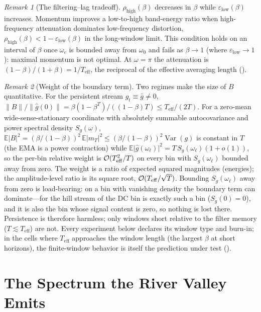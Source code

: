 \documentclass[11pt,a4paper]{article}
\theoremstyle{remark}
\newtheorem{remark}{Remark}
\newcommand{\Teff}{T_{\mathrm{eff}}}
\newcommand{\rhohigh}{\rho_{\mathrm{high}}}
\newcommand{\epslow}{\varepsilon_{\mathrm{low}}}
\begin{document}
\begin{remark}[The filtering--lag tradeoff]
\label{rem:tradeoff}
$\rhohigh(\beta)$ decreases in $\beta$ while $\epslow(\beta)$ increases.
Momentum improves a low-to-high band-energy ratio when high-frequency attenuation dominates low-frequency distortion, $\rhohigh(\beta)<1-\epslow(\beta)$ in the long-window limit.
This condition holds on an interval of $\beta$ once $\omega_c$ is bounded away from $\omega_0$ and fails as $\beta\to1$ (where $\epslow\to1$): maximal momentum is not optimal.
At $\omega=\pi$ the attenuation is $(1-\beta)/(1+\beta)=1/\Teff$, the reciprocal of the effective averaging length ().
\end{remark}

\begin{remark}[Weight of the boundary term]
\label{rem:boundary}
Two regimes make the size of $B$ quantitative.
For the persistent stream $g_t\equiv\bar g\ne0$, $\lVert B\rVert/\lVert\hat g(0)\rVert=\beta(1-\beta^T)/((1-\beta)T)\le\Teff/(2T)$.
For a zero-mean wide-sense-stationary coordinate with absolutely summable autocovariance and power spectral density $S_g(\omega)$, $\mathbb{E}\lvert B\rvert^2=(\beta/(1-\beta))^2\,\mathbb{E}\lvert m_T\rvert^2 \le(\beta/(1-\beta))^2\operatorname{Var}(g)$ is constant in $T$ (the EMA is a power contraction) while $\mathbb{E}\lvert\hat g(\omega_\ell)\rvert^2=T\,S_g(\omega_\ell)(1+o(1))$, so the per-bin relative weight is $\Ocal(\Teff^2/T)$ on every bin with $S_g(\omega_\ell)$ bounded away from zero.
The weight is a ratio of expected squared magnitudes (energies); the amplitude-level ratio is its square root, $\Ocal(\Teff/\sqrt{T})$.
Bounding $S_g(\omega_\ell)$ away from zero is load-bearing: on a bin with vanishing density the boundary term can dominate---for the hill stream of  the DC bin is exactly such a bin ($S_g(0)=0$), and it is also the bin whose signal content is zero, so nothing is lost there.
Persistence is therefore harmless; only windows short relative to the filter memory ($T\lesssim\Teff$) are not.
Every experiment below declares its window type and burn-in; in the cells where $\Teff$ approaches the window length (the largest $\beta$ at short horizons), the finite-window behavior is itself the prediction under test ().
\end{remark}

\section{The Spectrum the River Valley Emits}
\label{sec:spectrum}
\end{document}
